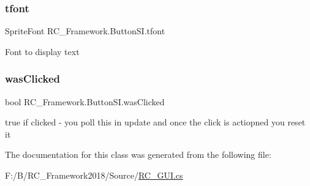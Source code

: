 \mbox{\label{class_r_c___framework_1_1_button_s_i_a9e1b4799a8570e57594d051479ead0f0}} 
\subsubsection{\texorpdfstring{tfont}{tfont}}
{\footnotesize\ttfamily Sprite\+Font R\+C\+\_\+\+Framework.\+Button\+S\+I.\+tfont}



Font to display text 

\mbox{\label{class_r_c___framework_1_1_button_s_i_af137c098b87fc391e613d52ba00db7e4}} 
\subsubsection{\texorpdfstring{was\+Clicked}{wasClicked}}
{\footnotesize\ttfamily bool R\+C\+\_\+\+Framework.\+Button\+S\+I.\+was\+Clicked}



true if clicked -\/ you poll this in update and once the click is actiopned you reset it 



The documentation for this class was generated from the following file\+:\begin{DoxyCompactItemize}
\item 
F\+:/\+B/\+R\+C\+\_\+\+Framework2018/\+Source/\mbox{\hyperlink{_r_c___g_u_i_8cs}{R\+C\+\_\+\+G\+U\+I.\+cs}}\end{DoxyCompactItemize}
